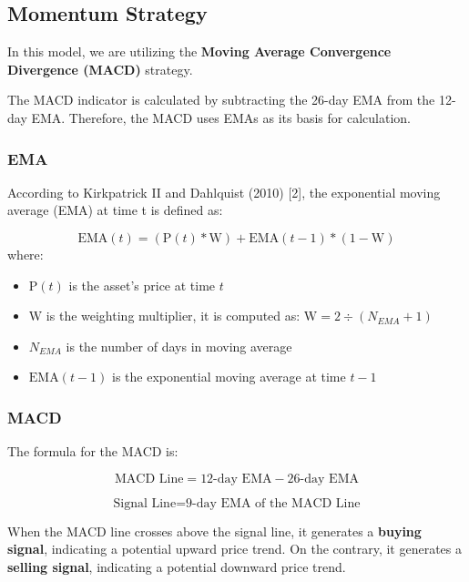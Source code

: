 \documentclass[a4paper, 12pt]{article}
\begin{document}
    \subsection{Momentum Strategy}
        In this model, we are utilizing the \textbf{Moving Average Convergence Divergence (MACD)} strategy.

        The MACD indicator is calculated by subtracting the 26-day EMA from the 12-day EMA. Therefore, the MACD uses EMAs as its basis for calculation.
        
        \subsubsection{EMA}
            According to Kirkpatrick II and Dahlquist (2010) [2], the exponential moving average (EMA) at time t is defined as:
    
            $$\text{EMA}(t) = (\text{P}(t) * \text{W}) + \text{EMA}(t-1) * (1 - \text{W})$$
            where:
    
            \begin{itemize}
                \item $\text{P}(t)$ is the asset’s price at time $t$
                \item $\text{W}$ is the weighting multiplier, it is computed as: $\text{W}= 2 ÷ (N_{EMA} + 1)$
                \item $N_{EMA}$ is the number of days in moving average
                \item $\text{EMA}(t-1)$ is the exponential moving average at time $t-1$
            \end{itemize}
    
        \subsubsection{MACD}

            The formula for the MACD is:

            $$ \text{MACD Line} = \text{12-day EMA} - \text{26-day EMA} $$
            
            $$ \text{Signal Line} = \text{9-day EMA} \text{ of the MACD Line} $$
            
            
            When the MACD line crosses above the signal line, it generates a \textbf{buying signal}, indicating a potential upward price trend. On the contrary, it generates a \textbf{selling signal}, indicating a potential downward price trend.
\end{document}

